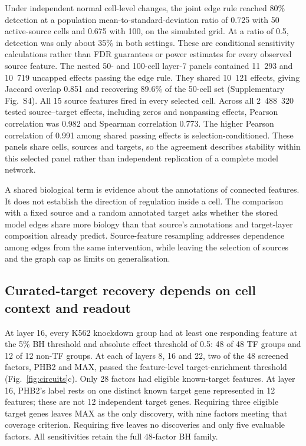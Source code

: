 \documentclass[review,authoryear,12pt]{elsarticle}
\begin{document}
Under independent normal cell-level changes, the joint edge rule reached 80\% detection at a
population mean-to-standard-deviation ratio of 0.725 with 50 active-source cells and 0.675 with
100, on the simulated grid. At a ratio of 0.5, detection was only about 35\% in both settings.
These are conditional sensitivity calculations rather than FDR guarantees or power estimates
for every observed source feature.
The nested 50- and 100-cell layer-7 panels contained 11~293 and 10~719 uncapped effects passing
the edge rule. They shared 10~121 effects, giving Jaccard overlap 0.851 and recovering 89.6\%
of the 50-cell set (Supplementary Fig.~S4). All 15 source features fired in every selected cell.
Across all 2~488~320 tested source--target effects, including zeros and nonpassing effects,
Pearson correlation was 0.982 and Spearman correlation 0.773. The higher Pearson correlation
of 0.991 among shared passing effects is selection-conditioned. These panels share cells,
sources and targets, so the agreement describes stability within this selected panel rather
than independent replication of a complete model network.

A shared biological term is evidence about the annotations of connected features. It does not
establish the direction of regulation inside a cell. The comparison with a fixed source and a
random annotated target asks whether the stored model edges share more biology than that
source's annotations and target-layer composition already predict. Source-feature resampling
addresses dependence among edges from the same intervention, while leaving the selection of
sources and the graph cap as limits on generalisation.

\subsection{Curated-target recovery depends on cell context and readout}

At layer 16, every K562 knockdown group had at least one responding feature at the 5\% BH threshold and
absolute effect threshold of 0.5: 48 of 48 TF groups and 12 of 12 non-TF groups.
At each of layers 8, 16 and 22, two of the 48 screened factors, PHB2 and MAX, passed the
feature-level target-enrichment threshold (Fig.~\ref{fig:circuits}c). Only 28 factors had eligible
known-target features. At layer 16, PHB2's label rests on one distinct known target gene represented
in 12 features; these are not 12 independent target genes. Requiring three eligible target genes
leaves MAX as the only discovery, with nine factors meeting that coverage criterion. Requiring
five leaves no discoveries and only five evaluable factors. All sensitivities retain the full
48-factor BH family.
\end{document}

